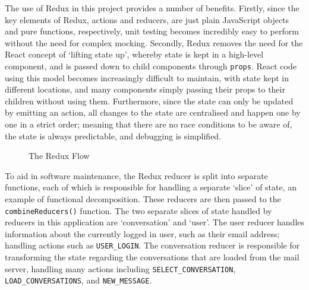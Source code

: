 The use of Redux in this project provides a number of benefits. Firstly, since the key elements of Redux, actions and reducers, are just plain JavaScript objects and pure functions, respectively, unit testing becomes incredibly easy to perform without the need for complex mocking. Secondly, Redux removes the need for the React concept of `lifting state up', whereby state is kept in a high-level component, and is passed down to child components through \verb|props|. React code using this model becomes increasingly difficult to maintain, with state kept in different locations, and many components simply passing their props to their children without using them. Furthermore, since the state can only be updated by emitting an action, all changes to the state are centralised and happen one by one in a strict order; meaning that there are no race conditions to be aware of, the state is always predictable, and debugging is simplified.

\begin{figure}[h!]
  \begin{center}
    \caption{The Redux Flow}
    \label{fig:redux-cycle}
  \end{center}
\end{figure}

To aid in software maintenance, the Redux reducer is split into separate functions, each of which is responsible for handling a separate `slice' of state, an example of functional decomposition. These reducers are then passed to the \verb|combineReducers()| function. The two separate slices of state handled by reducers in this application are `conversation' and `user'. The user reducer handles information about the currently logged in user, such as their email address; handling actions such as \verb|USER_LOGIN|. The conversation reducer is responsible for transforming the state regarding the conversations that are loaded from the mail server, handling many actions including \verb|SELECT_CONVERSATION|, \verb|LOAD_CONVERSATIONS|, and \verb|NEW_MESSAGE|.

